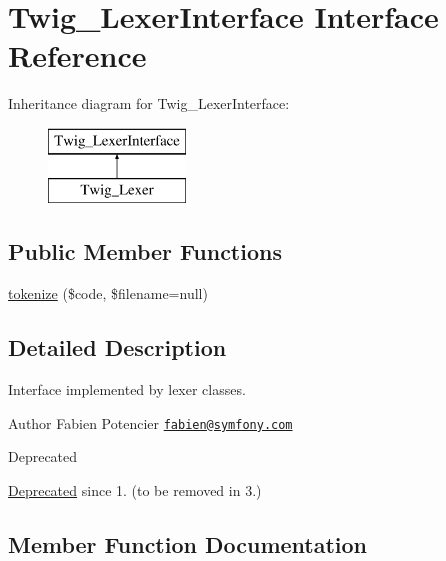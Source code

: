 \hypertarget{interfaceTwig__LexerInterface}{}\section{Twig\+\_\+\+Lexer\+Interface Interface Reference}
\label{interfaceTwig__LexerInterface}
Inheritance diagram for Twig\+\_\+\+Lexer\+Interface\+:\begin{figure}[H]
\begin{center}
\leavevmode
\includegraphics[height=2.000000cm]{interfaceTwig__LexerInterface}
\end{center}
\end{figure}
\subsection*{Public Member Functions}
\begin{DoxyCompactItemize}
\item 
\hyperlink{interfaceTwig__LexerInterface_af2c85f855d218144809f104bdc90213f}{tokenize} (\$code, \$filename=null)
\end{DoxyCompactItemize}


\subsection{Detailed Description}
Interface implemented by lexer classes.

\begin{DoxyAuthor}{Author}
Fabien Potencier \href{mailto:fabien@symfony.com}{\tt fabien@symfony.\+com}
\end{DoxyAuthor}
\begin{DoxyRefDesc}{Deprecated}
\item[\hyperlink{deprecated__deprecated000029}{Deprecated}]since 1. (to be removed in 3.) \end{DoxyRefDesc}


\subsection{Member Function Documentation}
